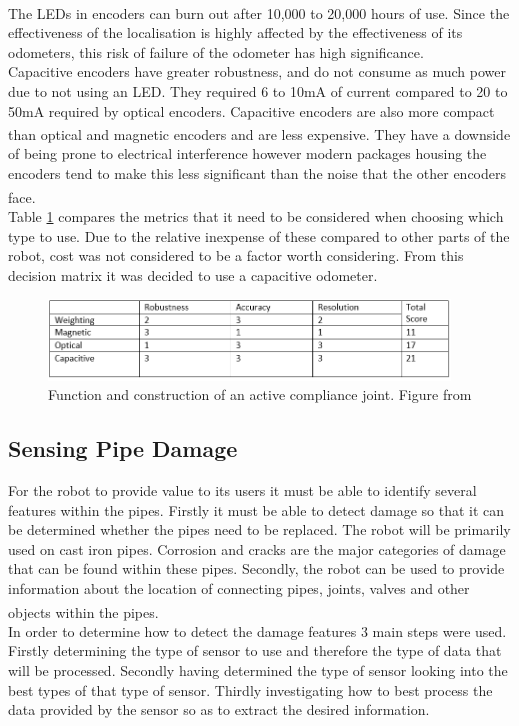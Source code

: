 \documentclass[11pt]{article}		%
\newcommand{\supercite}[1]{\textsuperscript{\cite{#1}}}		%
\begin{document}
	        The LEDs in encoders can burn out after 10,000 to 20,000 hours of use. \supercite{Encoders} 
	        Since the effectiveness of the localisation is highly affected by  the effectiveness of its odometers, this risk of failure of the odometer has high significance.
	        \\
	        Capacitive encoders have greater robustness, and do not consume as much power due to not using an LED. 
	        They required 6 to 10mA of current compared to 20 to 50mA required by optical encoders.
	        Capacitive encoders are also more compact than optical and magnetic encoders and are less expensive\supercite{Encoders}. 
	        They have a downside of being prone to electrical interference however modern packages housing the encoders tend to make this less significant than the noise that the other encoders face.\supercite{Encoders}
	        \\
	        Table \ref{odometer_comparison} compares the metrics that it need to be considered when choosing which type to use. 
	        Due to the relative inexpense of these compared to other parts of the robot, cost was not considered to be a factor worth considering. 
	        From this decision matrix it was decided to use a capacitive odometer. 
	        \begin{figure}[h]
						\centering
							\includegraphics[width=0.95\textwidth]{Table_comparing_odometer_encoders.PNG}
							\caption{Function and construction of an active compliance joint. Figure from \cite{park2010normal}}
							\label{odometer_comparison}
					\end{figure}
	
	        \subsection{Sensing Pipe Damage}
	        
	        For the robot to provide value to its users it must be able to identify several features within the pipes. 
	        Firstly it must be able to detect damage so that it can be determined whether the pipes need to be replaced.
	        The robot will be primarily used on cast iron pipes. 
	        Corrosion and cracks are the major categories of damage that can be found within these pipes.    
	        Secondly, the robot can be used to provide information about the location of connecting pipes, joints, valves and other objects within the pipes. \supercite{Failure_pipes} \supercite{Failure_pipes2}
	        \\
	        In order to determine how to detect the damage features 3 main steps were used. 
	        Firstly determining the type of sensor to use and therefore the type of data that will be processed. 
	        Secondly having determined the type of sensor looking into the best types of that type of sensor. 
	        Thirdly investigating how to best process the data provided by the sensor so as to extract the desired information.
	        
\end{document}
